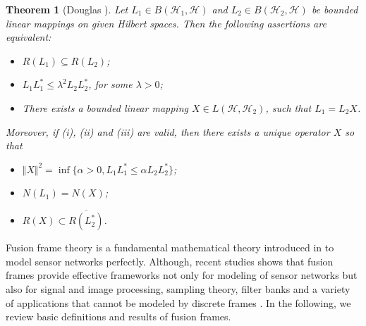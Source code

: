 \documentclass{birkjour}
\newtheorem{thm}{Theorem}[section]
\theoremstyle{definition}
\theoremstyle{remark}
\numberwithin{equation}{section}
\begin{document}
\begin{thm}[Douglas   \cite{Douglas}]\label{equ0}
Let $L_{1}\in B(\mathcal{H}_{1}, \mathcal{H})$ and $L_{2}\in B(\mathcal{H}_{2}, \mathcal{H})$ be bounded linear mappings on given Hilbert spaces. Then the following assertions are equivalent:
\begin{itemize}
\item[(i)]
$R(L_{1}) \subseteq R(L_{2})$;
\item[(ii)]
$L_{1}L_{1}^{*} \leq \lambda^{2}L_{2}L_{2}^{*}$, \quad for some $\lambda > 0$;
\item[(iii)]
There exists a bounded linear mapping $X\in L(\mathcal{H}, \mathcal{H}_{2})$, such that $L_{1} = L_{2}X$.
\end{itemize}
Moreover, if (i), (ii) and (iii) are valid, then there exists a unique operator $X$ so that 
\begin{itemize}
\item[(a)]
$\Vert X\Vert ^{2} = \inf \{\alpha>0, L_{1}L_{1}^{*}\leq \alpha L_{2}L_{2}^{*}\}$;
\item[(b)]
$N( L_{1}) = N(X)$;
\item[(c)]
$R(X) \subset \overline{R( L_{2}^{*})} $.
\end{itemize}

\end{thm}


Fusion frame theory is a fundamental mathematical theory   introduced in  \cite{Cas04} to model sensor networks perfectly. 
Although, recent studies shows that fusion frames provide effective frameworks  not only for modeling of sensor networks but also   for signal and image processing, sampling theory, filter banks and a variety of applications that cannot be modeled by discrete frames \cite{Cas08, sensor, hear}. In the following, we review basic definitions and  results of fusion frames.
\end{document}
